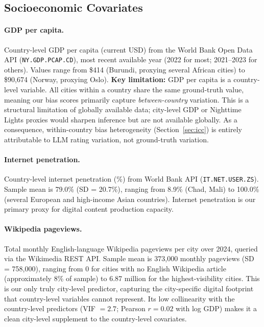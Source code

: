\documentclass[12pt]{article}
\begin{document}
\subsection{Socioeconomic Covariates}

\paragraph{GDP per capita.} Country-level GDP per capita (current USD) from the World Bank Open Data API (\texttt{NY.GDP.PCAP.CD}), most recent available year (2022 for most; 2021--2023 for others). Values range from \$414 (Burundi, proxying several African cities) to \$90,674 (Norway, proxying Oslo). \textbf{Key limitation:} GDP per capita is a country-level variable. All cities within a country share the same ground-truth value, meaning our bias scores primarily capture \emph{between-country} variation. This is a structural limitation of globally available data; city-level GDP or Nighttime Lights proxies would sharpen inference but are not available globally. As a consequence, within-country bias heterogeneity (Section~\ref{sec:icc}) is entirely attributable to LLM rating variation, not ground-truth variation.

\paragraph{Internet penetration.} Country-level internet penetration (\%) from World Bank API (\texttt{IT.NET.USER.ZS}). Sample mean is 79.0\% (SD = 20.7\%), ranging from 8.9\% (Chad, Mali) to 100.0\% (several European and high-income Asian countries). Internet penetration is our primary proxy for digital content production capacity.

\paragraph{Wikipedia pageviews.} Total monthly English-language Wikipedia pageviews per city over 2024, queried via the Wikimedia REST API. Sample mean is 373,000 monthly pageviews (SD = 758,000), ranging from 0 for cities with no English Wikipedia article (approximately 8\% of sample) to 6.87 million for the highest-visibility cities. This is our only truly city-level predictor, capturing the city-specific digital footprint that country-level variables cannot represent. Its low collinearity with the country-level predictors (VIF $= 2.7$; Pearson $r = 0.02$ with log GDP) makes it a clean city-level supplement to the country-level covariates.
\end{document}
